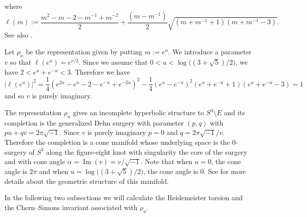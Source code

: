 \documentclass[a4paper]{amsart}
\theoremstyle{plain}
\theoremstyle{definition}
\theoremstyle{remark}
\renewcommand{\Im}{\operatorname{Im}}
\numberwithin{equation}{section}
\begin{document}
where
\begin{equation*}
  \ell(m)
  :=
  \frac{m^2-m-2-m^{-1}+m^{-2}}{2}
  +
  \frac{(m-m^{-1})}{2}\sqrt{(m+m^{-1}+1)(m+m^{-1}-3)}.
\end{equation*}
See also \cite[Section~3.1]{Murakami:ACTMV2008}.
\par
Let $\rho_u$ be the representation given by putting $m:=e^u$.
We introduce a parameter $v$ so that $\ell(e^u)=e^{v/2}$.
Since we assume that $0<u<\log\bigl((3+\sqrt{5})/2\bigr)$, we have $2<e^u+e^{-u}<3$.
Therefore we have
\begin{equation*}
  |\ell(e^u)|^2
  =
  \frac{1}{4}
  (e^{2u}-e^u-2-e^{-u}+e^{-2u})^2
  -
  \frac{1}{4}
  (e^u-e^{-u})^2(e^u+e^{-u}+1)(e^u+e^{-u}-3)
  =
  1
\end{equation*}
and so $v$ is purely imaginary.
\par
The representation $\rho_u$ gives an incomplete hyperbolic structure to $S^3\setminus{E}$ and its completion is the generalized Dehn surgery \cite{Thurston:GT3M} with parameter $(p,q)$ with $pu+qv=2\pi\sqrt{-1}$.
Since $v$ is purely imaginary $p=0$ and $q=2\pi\sqrt{-1}/v$.
Therefore the completion is a cone manifold whose underlying space is the $0$-surgery of $S^3$ along the figure-eight knot with singularity the core of the surgery and with cone angle $\alpha=\Im(v)=v/\sqrt{-1}$.
Note that when $u=0$, the cone angle is $2\pi$ and when $u=\log\bigl((3+\sqrt{5})/2\bigr)$, the cone angle is $0$.
See \cite{Hilden/Lozano/Montesinos:JMASU1995} for more details about the geometric structure of this manifold.
\par
In the following two subsections we will calculate the Reidemeister torsion and the Chern--Simons invariant associated with $\rho_u$.
\end{document}
